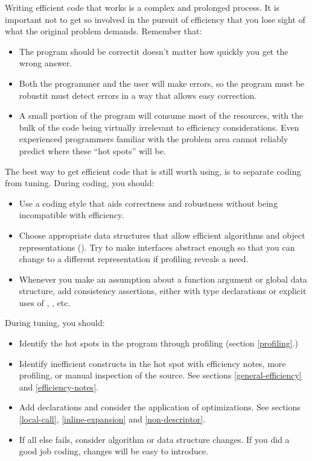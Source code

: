 Writing efficient code that works is a complex and prolonged process.
It is important not to get so involved in the pursuit of efficiency
that you lose sight of what the original problem demands.  Remember
that:
\begin{itemize}
  
\item The program should be correct\dash{}it doesn't matter how
  quickly you get the wrong answer.
  
\item Both the programmer and the user will make errors, so the
  program must be robust\dash{}it must detect errors in a way that
  allows easy correction.
  
\item A small portion of the program will consume most of the
  resources, with the bulk of the code being virtually irrelevant to
  efficiency considerations.  Even experienced programmers familiar
  with the problem area cannot reliably predict where these ``hot
  spots'' will be.
\end{itemize}



The best way to get efficient code that is still worth using, is to separate
coding from tuning.  During coding, you should:
\begin{itemize}
  
\item Use a coding style that aids correctness and robustness without
  being incompatible with efficiency.
  
\item Choose appropriate data structures that allow efficient
  algorithms and object representations
  ().  Try to make interfaces abstract
  enough so that you can change to a different representation if
  profiling reveals a need.
  
\item Whenever you make an assumption about a function argument or
  global data structure, add consistency assertions, either with type
  declarations or explicit uses of , , etc.
\end{itemize}

During tuning, you should:
\begin{itemize}
  
\item Identify the hot spots in the program through profiling (section
  \ref{profiling}.)
  
\item Identify inefficient constructs in the hot spot with efficiency
  notes, more profiling, or manual inspection of the source.  See
  sections \ref{general-efficiency} and \ref{efficiency-notes}.
  
\item Add declarations and consider the application of optimizations.
  See sections \ref{local-call}, \ref{inline-expansion} and
  \ref{non-descriptor}.
  
\item If all else fails, consider algorithm or data structure changes.
  If you did a good job coding, changes will be easy to introduce.
\end{itemize}


